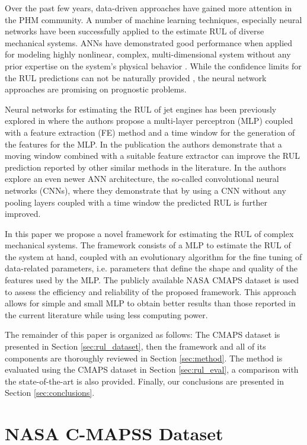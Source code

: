 \documentclass[12pt]{IEEEtran}%
\begin{document}
Over the past few years, data-driven approaches have gained more attention in
the PHM community. A number of machine learning techniques, especially neural
networks have been successfully applied to the estimate RUL of diverse
mechanical systems. ANNs have demonstrated good performance when applied for
modeling highly nonlinear, complex, multi-dimensional system without any prior
expertise on the system's physical behavior \cite{Li2018}. While the
confidence limits for the RUL predictions can not be naturally provided
\cite{Sikorska2011}, the neural network approaches are promising on prognostic problems.

Neural networks for estimating the RUL of jet engines has been previously
explored in \cite{Lim2016} where the authors propose a multi-layer perceptron
(MLP) coupled with a feature extraction (FE) method and a time window for the
generation of the features for the MLP. In the publication the authors
demonstrate that a moving window combined with a suitable feature extractor
can improve the RUL prediction reported by other similar methods in the
literature. In \cite{Li2018} the authors explore an even newer ANN
architecture, the so-called convolutional neural networks (CNNs), where they
demonstrate that by using a CNN without any pooling layers coupled with a time
window the predicted RUL is further improved.

In this paper we propose a novel framework for estimating the RUL of complex
mechanical systems. The framework consists of a MLP to estimate the RUL of the
system at hand, coupled with an evolutionary algorithm for the fine tuning of
data-related parameters, i.e. parameters that define the shape and quality of
the features used by the MLP. The publicly available NASA CMAPS dataset
\cite{CMAPS2008} is used to assess the efficiency and reliability of the
proposed framework. This approach allows for simple and small MLP to obtain
better results than those reported in the current literature while using less
computing power.

The remainder of this paper is organized as follows: The CMAPS dataset is
presented in Section \ref{sec:rul_dataset}, then the framework and all of its
components are thoroughly reviewed in Section \ref{sec:method}. The method is
evaluated using the CMAPS dataset in Section \ref{sec:rul_eval}, a comparison
with the state-of-the-art is also provided. Finally, our conclusions are
presented in Section \ref{sec:conclusions}.

\section{NASA C-MAPSS Dataset}
\end{document}
